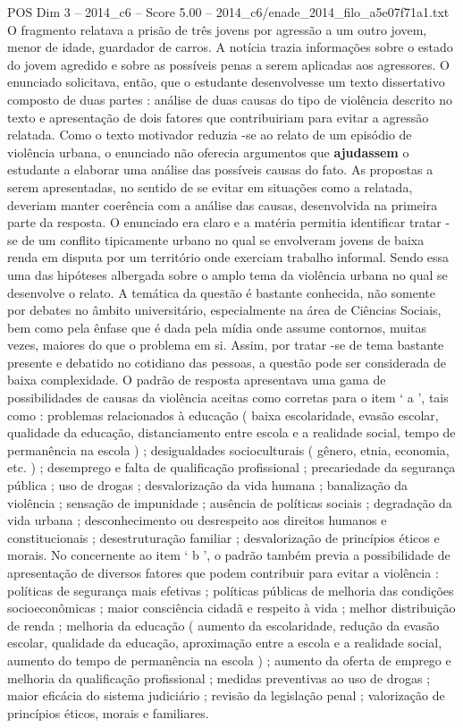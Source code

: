 \begin{textsample}{POS Dim 3 – 2014\_c6 – Score 5.00 – 2014\_c6/enade\_2014\_filo\_a5e07f71a1.txt}
O fragmento relatava a prisão de três jovens por agressão a um outro jovem, menor de idade, guardador de carros.
A notícia trazia informações sobre o estado do jovem agredido e sobre as possíveis penas a serem aplicadas aos agressores.
O enunciado solicitava, então, que o estudante desenvolvesse um texto dissertativo composto de duas partes : análise de duas causas do tipo de violência descrito no texto e apresentação de dois fatores que contribuiriam para evitar a agressão relatada.
Como o texto motivador reduzia -se ao relato de um episódio de violência urbana, o enunciado não oferecia argumentos que \textbf{ajudassem} o estudante a elaborar uma análise das possíveis causas do fato.
As propostas a serem apresentadas, no sentido de se evitar em situações como a relatada, deveriam manter coerência com a análise das causas, desenvolvida na primeira parte da resposta.
O enunciado era claro e a matéria permitia identificar tratar -se de um conflito tipicamente urbano no qual se envolveram jovens de baixa renda em disputa por um território onde exerciam trabalho informal.
Sendo essa uma das hipóteses albergada sobre o amplo tema da violência urbana no qual se desenvolve o relato.
A temática da questão é bastante conhecida, não somente por debates no âmbito universitário, especialmente na área de Ciências Sociais, bem como pela ênfase que é dada pela mídia onde assume contornos, muitas vezes, maiores do que o problema em si.
Assim, por tratar -se de tema bastante presente e debatido no cotidiano das pessoas, a questão pode ser considerada de baixa complexidade.
O padrão de resposta apresentava uma gama de possibilidades de causas da violência aceitas como corretas para o item ‘ a ’, tais como : problemas relacionados à educação ( baixa escolaridade, evasão escolar, qualidade da educação, distanciamento entre escola e a realidade social, tempo de permanência na escola ) ; desigualdades socioculturais ( gênero, etnia, economia, etc. ) ; desemprego e falta de qualificação profissional ; precariedade da segurança pública ; uso de drogas ; desvalorização da vida humana ; banalização da violência ; sensação de impunidade ; ausência de políticas sociais ; degradação da vida urbana ; desconhecimento ou desrespeito aos direitos humanos e constitucionais ; desestruturação familiar ; desvalorização de princípios éticos e morais.
No concernente ao item ‘ b ’, o padrão também previa a possibilidade de apresentação de diversos fatores que podem contribuir para evitar a violência : políticas de segurança mais efetivas ; políticas públicas de melhoria das condições socioeconômicas ; maior consciência cidadã e respeito à vida ; melhor distribuição de renda ; melhoria da educação ( aumento da escolaridade, redução da evasão escolar, qualidade da educação, aproximação entre a escola e a realidade social, aumento do tempo de permanência na escola ) ; aumento da oferta de emprego e melhoria da qualificação profissional ; medidas preventivas ao uso de drogas ; maior eficácia do sistema judiciário ; revisão da legislação penal ; valorização de princípios éticos, morais e familiares.

\end{textsample}
